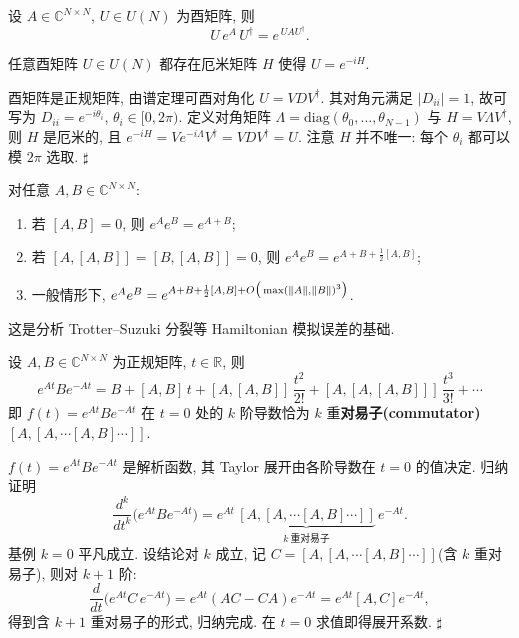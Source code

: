 \documentclass[utf8]{article} %
\numberwithin{equation}{section}   %
\newtheorem{Lem}{\hskip 2em {\color{magenta} 引理}}[subsection]
\newtheorem{Prop}{\hskip 2em {\color{cyan} 命题}}[subsection]
\newenvironment{Proof}{{\noindent\it Proof:}\quad}{\hfill $\sharp $\par}
\begin{document}
\begin{Lem}
    设 $A \in \mathbb{C}^{N\times N}$, $U \in U(N)$ 为酉矩阵, 则
    \[ U\, e^A\, U^\dagger = e^{\,U A U^\dagger}. \]
\end{Lem}

\begin{Prop}[酉矩阵的指数表示]
    任意酉矩阵 $U \in U(N)$ 都存在厄米矩阵 $H$ 使得 $U = e^{-iH}$.
\end{Prop}

\begin{Proof}
    酉矩阵是正规矩阵, 由谱定理可酉对角化 $U = V D V^\dagger$. 其对角元满足 $|D_{ii}| = 1$,
    故可写为 $D_{ii} = e^{-i\theta_i}$, $\theta_i \in [0, 2\pi)$. 定义对角矩阵
    $\Lambda = \mathrm{diag}(\theta_0, \dots, \theta_{N-1})$ 与 $H = V \Lambda V^\dagger$,
    则 $H$ 是厄米的, 且 $e^{-iH} = V e^{-i\Lambda} V^\dagger = V D V^\dagger = U$.
    注意 $H$ 并不唯一: 每个 $\theta_i$ 都可以模 $2\pi$ 选取.
\end{Proof}

\begin{Lem}
    对任意 $A, B \in \mathbb{C}^{N\times N}$:
    \begin{enumerate}
        \item 若 $[A, B] = 0$, 则 $e^A e^B = e^{A+B}$;
        \item 若 $[A, [A, B]] = [B, [A, B]] = 0$, 则 $e^A e^B = e^{A + B + \frac{1}{2}[A,B]}$;
        \item 一般情形下, $e^A e^B = e^{A + B + \frac{1}{2}[A,B] + O\big(\max(\norm{A}, \norm{B})^3\big)}$.
    \end{enumerate}
    这是分析 Trotter--Suzuki 分裂等 Hamiltonian 模拟误差的基础.
\end{Lem}

\begin{Lem}
    设 $A, B \in \mathbb{C}^{N\times N}$ 为正规矩阵, $t \in \mathbb{R}$, 则
    \begin{equation}
        e^{At} B e^{-At}
        = B + [A, B]\, t + [A, [A, B]]\, \frac{t^2}{2!} + [A, [A, [A, B]]]\, \frac{t^3}{3!} + \cdots
    \end{equation}
    即 $f(t) = e^{At} B e^{-At}$ 在 $t = 0$ 处的 $k$ 阶导数恰为 $k$ 重\textbf{对易子(commutator)}
    $[A, [A, \cdots [A, B]\cdots]]$.
\end{Lem}

\begin{Proof}
    $f(t) = e^{At} B e^{-At}$ 是解析函数, 其 Taylor 展开由各阶导数在 $t = 0$ 的值决定.
    归纳证明
    \[ \frac{d^k}{dt^k}\big(e^{At} B e^{-At}\big)
    = e^{At}\, \underbrace{[A, [A, \cdots [A, B]\cdots]]}_{k\ \text{重对易子}}\, e^{-At}. \]
    基例 $k = 0$ 平凡成立. 设结论对 $k$ 成立, 记 $C = [A, [A, \cdots [A, B]\cdots]]$(含 $k$ 重对易子),
    则对 $k+1$ 阶:
    \[
        \frac{d}{dt}\Big(e^{At} C\, e^{-At}\Big)
        = e^{At} (AC - CA) e^{-At} = e^{At} [A, C] e^{-At},
    \]
    得到含 $k+1$ 重对易子的形式, 归纳完成. 在 $t = 0$ 求值即得展开系数.
\end{Proof}
\end{document}
